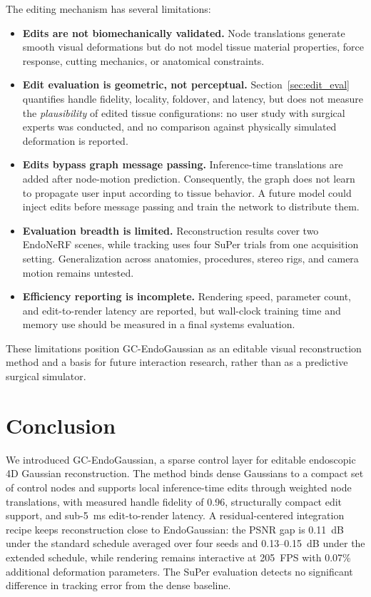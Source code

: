 \documentclass[AMA,Times1COL]{WileyNJDv5} %
\begin{document}
The editing mechanism has several limitations:
\begin{itemize}
\item \textbf{Edits are not biomechanically validated.} Node translations generate smooth visual deformations but do not model tissue material properties, force response, cutting mechanics, or anatomical constraints.
\item \textbf{Edit evaluation is geometric, not perceptual.} Section~\ref{sec:edit_eval} quantifies handle fidelity, locality, foldover, and latency, but does not measure the \emph{plausibility} of edited tissue configurations: no user study with surgical experts was conducted, and no comparison against physically simulated deformation is reported.
\item \textbf{Edits bypass graph message passing.} Inference-time translations are added after node-motion prediction. Consequently, the graph does not learn to propagate user input according to tissue behavior. A future model could inject edits before message passing and train the network to distribute them.
\item \textbf{Evaluation breadth is limited.} Reconstruction results cover two EndoNeRF scenes, while tracking uses four SuPer trials from one acquisition setting. Generalization across anatomies, procedures, stereo rigs, and camera motion remains untested.
\item \textbf{Efficiency reporting is incomplete.} Rendering speed, parameter count, and edit-to-render latency are reported, but wall-clock training time and memory use should be measured in a final systems evaluation.
\end{itemize}

These limitations position GC-EndoGaussian as an editable visual reconstruction method and a basis for future interaction research, rather than as a predictive surgical simulator.

\section{Conclusion}\label{sec7}

We introduced GC-EndoGaussian, a sparse control layer for editable endoscopic 4D Gaussian reconstruction. The method binds dense Gaussians to a compact set of control nodes and supports local inference-time edits through weighted node translations, with measured handle fidelity of 0.96, structurally compact edit support, and sub-5~ms edit-to-render latency. A residual-centered integration recipe keeps reconstruction close to EndoGaussian: the PSNR gap is 0.11~dB under the standard schedule averaged over four seeds and 0.13--0.15~dB under the extended schedule, while rendering remains interactive at 205~FPS with 0.07\% additional deformation parameters. The SuPer evaluation detects no significant difference in tracking error from the dense baseline.
\end{document}
